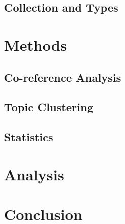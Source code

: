 \documentclass[a4paper]{article}
\begin{document}
\subsection{Collection and Types}
\blindtext{}

\section{Methods}
\blindtext{}

\subsection{Co-reference Analysis}
\blindtext{}

\subsection{Topic Clustering}
\blindtext{}

\subsection{Statistics}
\blindtext{}

\section{Analysis}
\blindtext{}

\section{Conclusion}
\blindtext{}



\end{document}
